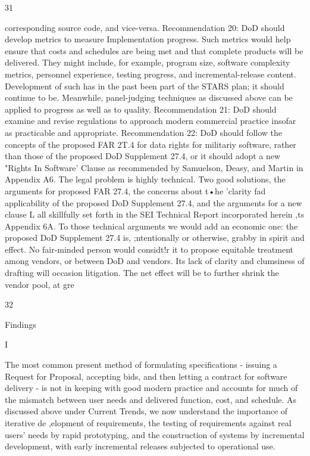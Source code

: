 \documentclass[12pt]{article}
\begin{document}
31

corresponding source code, and vice-versa.
Recommendation 20: DoD should develop metrics to measure Implementation progress.
Such metrics would help ensure that costs and schedules are being met and that
complete products will be delivered. They might include, for example, program size, software complexity metrics, personnel experience, testing progress, and incremental-release
content. Development of such has in the past been part of the STARS plan; it should
continue to be. Meanwhile, panel-judging techniques as discussed above can be applied to
progress as well as to quality.
Recommendation 21: DoD should examine and revise regulations to approach modern commercial practice insofar as practicable and appropriate.
Recommendation 22: DoD should follow the concepts of the proposed FAR
2T.4 for data rights for militariy software, rather than those of the proposed
DoD Supplement 27.4, or it should adopt a new "Rights In Software' Clause
as recommended by Samuelson, Deasy, and Martin in Appendix A6.
The legal problem is highly technical. Two good solutions, the arguments for proposed
FAR 27.4, the concerns about t•he 'clarity fad applicability of the proposed DoD Supplement
27.4, and the arguments for a new clause L all skillfully set forth in the SEI Technical
Report incorporated herein ,ts Appendix 6A.
To those technical arguments we would add an economic one: the proposed DoD
Supplement 27.4 is, ;ntentionally or otherwise, grabby in spirit and effect. No fair-minded
person would considt!r it to propose equitable treatment among vendors, or between DoD
and vendors. Its lack of clarity and clumsiness of drafting will occasion litigation. The net
effect will be to further shrink the vendor pool, at gre%

32

Findings

I

The most common present method of formulating specifications - issuing
a Request for Proposal, accepting bids, and then letting a contract for software
delivery - is not in keeping with good modern practice and accounts for much
of the mismatch between user needs and delivered function, cost, and schedule.
As discussed above under Current Trends, we now understand the importance of
iterative de ,elopment of requirements, the testing of requirements against real users' needs
by rapid prototyping, and the construction of systems by incremental development, with
early incremental releases subjected to operational use.
\end{document}
